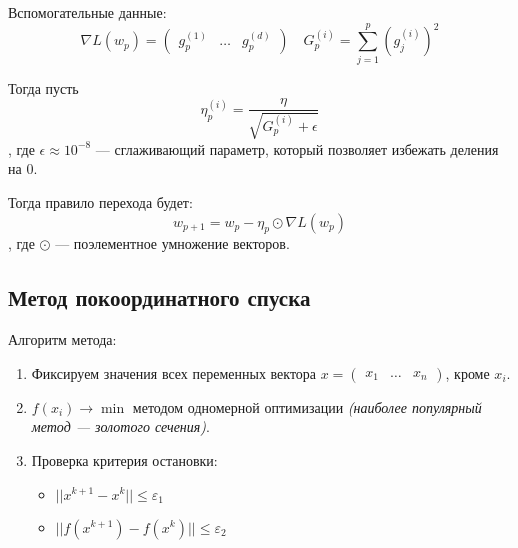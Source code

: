Вспомогательные данные:
\[\nabla L(w_p) = \begin{pmatrix} g_p^{(1)} & \dots & g_p^{(d)} \end{pmatrix} \quad G_p^{(i)} = \sum_{j = 1}^p (g_j^{(i)})^2\]

Тогда пусть
\[\eta_p^{(i)} = \frac{\eta}{\sqrt{G^{(i)}_p + \epsilon}}\]
, где \(\epsilon \approx 10^{ - 8}\) --- сглаживающий параметр, который позволяет избежать деления на \(0\).

Тогда правило перехода будет:
\[w_{p + 1} = w_p - \eta_p \odot \nabla L(w_p)\]
, где \(\odot\) --- поэлементное умножение векторов.

\subsection{Метод покоординатного спуска}

Алгоритм метода:
\begin{enumerate}
    \item Фиксируем значения всех переменных вектора \(x = \begin{pmatrix} x_1 & \dots & x_n \end{pmatrix} \), кроме \(x_i\).
    \item \(f(x_i) \to \min\) методом одномерной оптимизации \textit{(наиболее популярный метод --- золотого сечения)}.
    \item Проверка критерия остановки:
          \begin{itemize}
              \item \(||x^{k + 1} - x^k|| \leq \varepsilon_1\)
              \item \(||f(x^{k + 1}) - f(x^k)|| \leq \varepsilon_2\)
          \end{itemize}
\end{enumerate}
